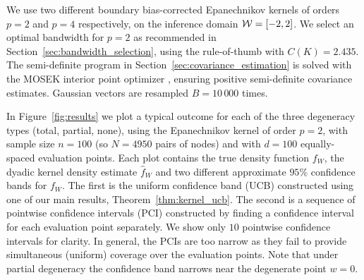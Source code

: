 We use two different boundary bias-corrected
Epanechnikov kernels of orders $p=2$ and $p=4$ respectively,
on the inference domain $\mathcal{W} = [-2,2]$.
We select an optimal bandwidth for $p=2$ as recommended in
Section~\ref{sec:bandwidth_selection},
using the rule-of-thumb with $C(K) = 2.435$.
The semi-definite program in Section~\ref{sec:covariance_estimation}
is solved with the MOSEK interior point optimizer \citep{mosek},
ensuring positive semi-definite covariance estimates.
Gaussian vectors are resampled
$B = 10\,000$ times.

In Figure~\ref{fig:results} we plot a typical outcome
for each of the three degeneracy types (total, partial, none),
using the Epanechnikov kernel of order $p=2$,
with sample size $n=100$
(so $N=4950$ pairs of nodes)
and with $d=100$ equally-spaced evaluation points.
Each plot contains the true density function $f_W$,
the dyadic kernel density estimate $\hat f_W$
and two different approximate $95\%$ confidence bands for $f_W$.
The first is the uniform confidence band (UCB)
constructed using one of our main results, Theorem~\ref{thm:kernel_ucb}.
The second is a sequence of pointwise confidence intervals (PCI)
constructed by finding a confidence interval for
each evaluation point separately.
We show only $10$ pointwise confidence intervals for clarity.
In general, the PCIs are too narrow as they fail to
provide simultaneous (uniform) coverage over the evaluation points.
Note that
under partial degeneracy the confidence band narrows near the
degenerate point $w = 0$.

